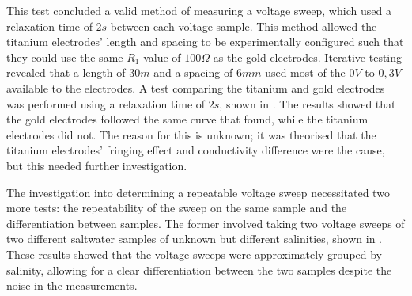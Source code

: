 This test concluded a valid method of measuring a voltage sweep, which used a relaxation time of $2s$ between each voltage sample.
This method allowed the titanium electrodes' length and spacing to be experimentally configured such that they could use the same $R_1$ value of $100\Omega$ as the gold electrodes.
Iterative testing revealed that a length of $30m$ and a spacing of $6mm$ used most of the $0V$ to $0,3V$ available to the electrodes.
A test comparing the titanium and gold electrodes was performed using a relaxation time of $2s$, shown in .
The results showed that the gold electrodes followed the same curve that  found, while the titanium electrodes did not.
The reason for this is unknown; it was theorised that the titanium electrodes' fringing effect and conductivity difference were the cause, but this needed further investigation.

The investigation into determining a repeatable voltage sweep necessitated two more tests: the repeatability of the sweep on the same sample and the differentiation between samples.
The former involved taking two voltage sweeps of two different saltwater samples of unknown but different salinities, shown in .
These results showed that the voltage sweeps were approximately grouped by salinity, allowing for a clear differentiation between the two samples despite the noise in the measurements.

